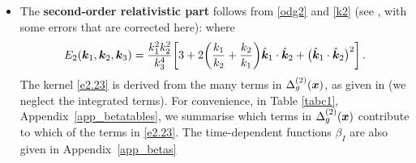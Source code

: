 {{{\begin{itemize}
\item
The {\bfseries second-order relativistic part} follows from \eqref{odg2} and \eqref{k2} (see \citep{Jolicoeur:2017eyi}, with some errors that are corrected here):
where
\begin{equation}
E_{2}(\bm{k}_{1}, \bm{k}_{2},\bm{k}_3)=\frac{k_{1}^{2}k_{2}^{2}}{k_{3}^{4}}
\bigg[3+2\bigg(\frac{k_{1}}{k_{2}} + \frac{k_{2}}{k_{1}}\bigg) \hat{\k}_1\cdot \hat{\k}_2 + \big( \hat{\k}_1\cdot \hat{\k}_2\big)^2\bigg]\,. %
\end{equation}
The kernel \eqref{e2.23} is derived from the many terms in $\Delta_g^{(2)}(\bm {x})$, as given in  \cite{Bertacca:2014dra, Bertacca:2014hwa} (we neglect the integrated terms). For convenience, in Table \ref{tabc1},  Appendix~\ref{app_betatables},  we summarise  which terms in $\Delta_g^{(2)}(\bm {x})$ contribute to which of the terms in  \eqref{e2.23}. The time-dependent functions $\beta_{I}$ are also given in Appendix~\ref{app_betas}
 

\end{itemize}}}}
